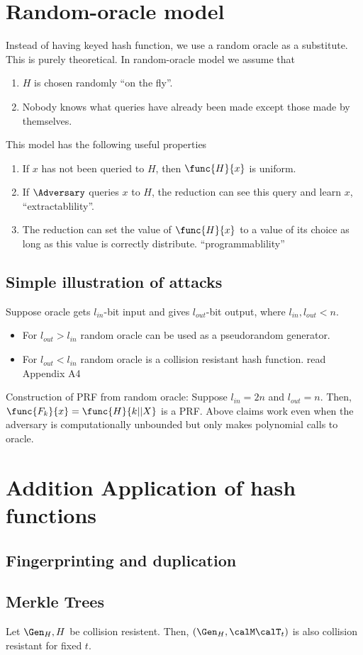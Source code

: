 \section{Random-oracle model}
Instead of having keyed hash function, we use a random oracle as a substitute. This is purely theoretical. In random-oracle model we assume that 
\begin{enumerate}
    \item \(H\) is chosen randomly ``on the fly''.
    \item Nobody knows what queries have already been made except those made by themselves.
\end{enumerate}
This model has the following useful properties 
\begin{enumerate}
    \item If \(x\) has not been queried  to \(H\), then \(\func{H}{x}\) is uniform.
    \item If \(\Adversary\) queries \(x\) to \(H\), the reduction can see this query and learn \(x\), ``extractablility''.
    \item The reduction can set the value of \(\func{H}{x}\) to a value of its choice as long as this value is correctly distribute. ``programmablility''
\end{enumerate}
\subsection{Simple illustration of attacks}
Suppose oracle gets \(l_{in}\)-bit input and gives \(l_{out}\)-bit output, where \(l_{in},l_{out} < n\). 
\begin{itemize}
    \item For \(l_{out} > l_{in}\) random oracle can be used as a pseudorandom generator.
    \item For \(l_{out} < l_{in}\) random oracle is a collision resistant hash function. read Appendix A4 
\end{itemize}
Construction of PRF from random oracle: Suppose \(l_{in} = 2n\) and \(l_{out} = n\). Then, \(\func{F_k}{x} = \func{H}{k||X}\) is a PRF. Above claims work even when the adversary is computationally unbounded but only makes polynomial calls to oracle. 

\section{Addition Application of hash functions}
\subsection{Fingerprinting and duplication}
\subsection{Merkle Trees}
\begin{theorem}
    Let \(\Gen_H,H\) be collision resistent. Then, \((\Gen_H,\calM\calT_t)\) is also collision resistant for fixed \(t\).
\end{theorem}